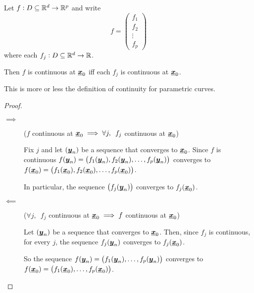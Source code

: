 \documentclass[12pt]{extarticle}
\renewcommand{\vec}[1]{\uvec{#1}}
\begin{document}
\begin{proposition}
    Let $f: D \subseteq \mathbb{R}^d \to \mathbb{R}^p$ and write
    \begin{equation}
        f = \begin{pmatrix}
            f_1    \\
            f_2    \\
            \vdots \\
            f_p
        \end{pmatrix}
    \end{equation}
    where each $f_j : D \subseteq \mathbb{R}^d \to \mathbb{R}$.

    Then $f$ is continuous at $\vec{x}_0$ iff each $f_j$ is continuous at $\vec{x}_0$.
\end{proposition}

\begin{remark}
    This is more or less the definition of continuity for parametric curves.
\end{remark}

\begin{proof}
    \skiplineafterproof
    \begin{description}
        \item[$\implies$] ($f$ continuous at $\vec{x}_0 \implies \forall j, \enspace f_j$ continuous at $\vec{x}_0$)

              Fix $j$ and let $\left(\vec{y}_n\right)$ be a sequence that converges to $\vec{x}_0$.
              Since $f$ is continuous $f(\vec{y}_n) = \left(f_1(\vec{y}_n), f_2(\vec{y}_n), \ldots, f_p(\vec{y}_n)\right)$ converges to $f(\vec{x}_0) = \left(f_1(\vec{x}_0), f_2(\vec{x}_0), \ldots, f_p(\vec{x}_0)\right)$.

              In particular, the sequence $\left(f_j(\vec{y}_n)\right)$ converges to $f_j(\vec{x}_0)$.

        \item[$\impliedby$] ($\forall j, \enspace f_j$ continuous at $\vec{x}_0 \implies f$ continuous at $\vec{x}_0$)

              Let $\left(\vec{y}_n\right)$ be a sequence that converges to $\vec{x}_0$. Then, since $f_j$ is continuous, for every $j$, the sequence $f_j(\vec{y}_n)$ converges to $f_j(\vec{x}_0)$.

              So the sequence $f(\vec{y}_n) = \left(f_1(\vec{y}_n), \ldots, f_p(\vec{y}_n)\right)$ converges to $f(\vec{x}_0) = \left(f_1(\vec{x}_0), \ldots, f_p(\vec{x}_0)\right)$.
    \end{description}
\end{proof}
\end{document}
